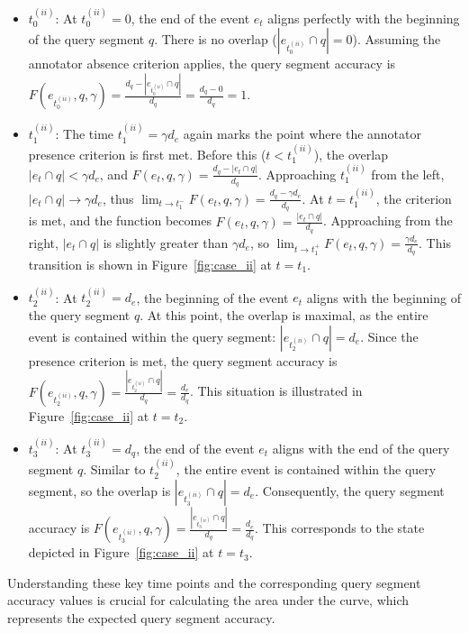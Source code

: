 \begin{itemize}
    \item $t^{(ii)}_0$: At $t^{(ii)}_0 = 0$, the end of the event $e_t$ aligns perfectly with the beginning of the query segment $q$. There is no overlap ($|e_{t^{(ii)}_0} \cap q| = 0$). Assuming the annotator absence criterion applies, the query segment accuracy is $F(e_{t^{(ii)}_0}, q, \gamma) = \frac{d_q - |e_{t^{(ii)}_0} \cap q|}{d_q} = \frac{d_q - 0}{d_q} = 1$.
    \item $t^{(ii)}_1$: The time $t^{(ii)}_1 = \gamma d_e$ again marks the point where the annotator presence criterion is first met. Before this ($t < t^{(ii)}_1$), the overlap $|e_t \cap q| < \gamma d_e$, and $F(e_t, q, \gamma) = \frac{d_q - |e_t \cap q|}{d_q}$. Approaching $t^{(ii)}_1$ from the left, $|e_t \cap q| \to \gamma d_e$, thus $\lim_{t \to t_1^-} F(e_{t}, q, \gamma) = \frac{d_q - \gamma d_e}{d_q}$. At $t = t^{(ii)}_1$, the criterion is met, and the function becomes $F(e_t, q, \gamma) = \frac{|e_t \cap q|}{d_q}$. Approaching from the right, $|e_t \cap q|$ is slightly greater than $\gamma d_e$, so $\lim_{t \to t_1^+} F(e_{t}, q, \gamma) = \frac{\gamma d_e}{d_q}$. This transition is shown in Figure~\ref{fig:case_ii} at $t=t_1$.
    \item $t^{(ii)}_2$: At $t^{(ii)}_2 = d_e$, the beginning of the event $e_t$ aligns with the beginning of the query segment $q$. At this point, the overlap is maximal, as the entire event is contained within the query segment: $|e_{t^{(ii)}_2} \cap q| = d_e$. Since the presence criterion is met, the query segment accuracy is $F(e_{t^{(ii)}_2}, q, \gamma) = \frac{|e_{t^{(ii)}_2} \cap q|}{d_q} = \frac{d_e}{d_q}$. This situation is illustrated in Figure~\ref{fig:case_ii} at $t=t_2$.
    \item $t^{(ii)}_3$: At $t^{(ii)}_3 = d_q$, the end of the event $e_t$ aligns with the end of the query segment $q$. Similar to $t^{(ii)}_2$, the entire event is contained within the query segment, so the overlap is $|e_{t^{(ii)}_3} \cap q| = d_e$. Consequently, the query segment accuracy is $F(e_{t^{(ii)}_3}, q, \gamma) = \frac{|e_{t^{(ii)}_3} \cap q|}{d_q} = \frac{d_e}{d_q}$. This corresponds to the state depicted in Figure~\ref{fig:case_ii} at $t=t_3$.
\end{itemize}

Understanding these key time points and the corresponding query segment accuracy values is crucial for calculating the area under the curve, which represents the expected query segment accuracy.

